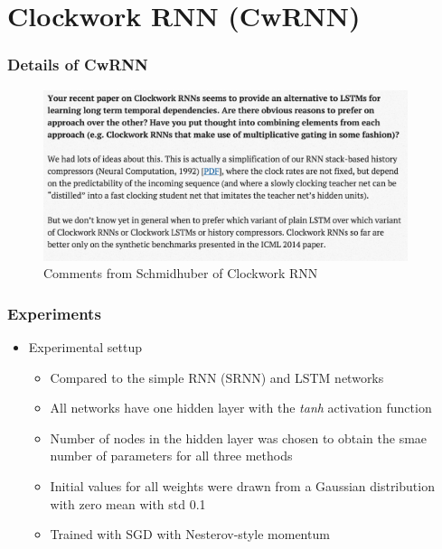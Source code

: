 \documentclass{beamer}
\begin{document}
\section{Clockwork RNN (CwRNN)}
\frame
{
   \frametitle{Details of CwRNN}
   \begin{figure}[ht]  
		\begin{center}
			\includegraphics[width=4.2in]{Images/comment_cwrnn.png}   
		\end{center}   
		\caption{Comments from Schmidhuber of Clockwork RNN}
	\end{figure}
}
\frame
{
   \frametitle{Experiments}
   \begin{itemize}
   	\item Experimental settup
   		\begin{itemize}
   			\item Compared to the simple RNN (SRNN) and LSTM networks
   			\item All networks have one hidden layer with the \textit{tanh} activation function
   			\item Number of nodes in the hidden layer was chosen to obtain the smae number of parameters for all three methods   			
   			\item Initial values for all weights were drawn from a Gaussian distribution with zero mean with std 0.1
   			\item Trained with SGD with Nesterov-style momentum
   		\end{itemize}
   \end{itemize}
}
\frame
\end{document}
